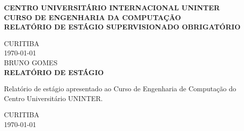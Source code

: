 \documentclass[12pt]{article}
\newcommand{\aluno}{Bruno Gomes}
\newcommand{\cidade}{curitiba}
\begin{document}
\begin{titlepage}
  \begin{center}
    \vspace{0.7cm}
    \textbf{CENTRO UNIVERSITÁRIO INTERNACIONAL UNINTER}\\
    \vspace{0.3cm}
    \textbf{CURSO DE ENGENHARIA DA COMPUTAÇÃO}\\
    \vspace{3cm}
    \logo
    \vspace{2cm}
    \textbf{\MakeUppercase{relatório de estágio supervisionado obrigatório}}\\
    \vspace{5cm}
  \end{center}
\end{titlepage}

\begin{center}
  \MakeUppercase{\cidade}\\
  \mydate \today\\
  \MakeUppercase{\aluno}\\
  \vspace{7cm}
  \textbf{RELATÓRIO DE ESTÁGIO}\\
\end{center}

\begin{minipage}[t]{0.5\textwidth}
\hfill
\end{minipage}
\begin{minipage}[t]{0.5\textwidth}
  \begin{flushright}
  Relatório de estágio apresentado ao Curso de Engenharia de Computação do Centro Universitário UNINTER.
  \end{flushright}
\end{minipage}
  

\newpage
\begin{center}
\MakeUppercase{\cidade}\\
\mydate \today \\
\end{center}
\tableofcontents

\newpage

\newpage

\newpage

\newpage

\newpage

\newpage

\newpage
\printbibliography
\end{document}
